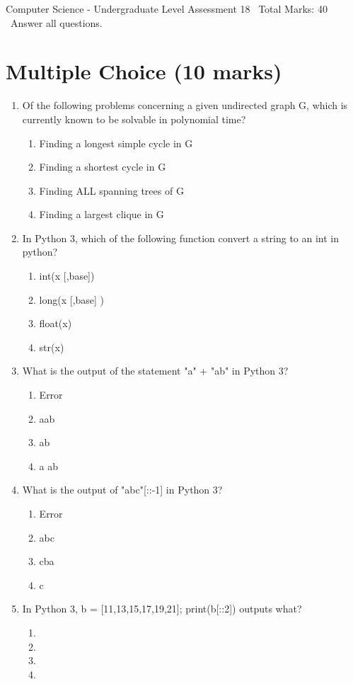 \documentclass[12pt]{article}
\begin{document}
\begin{center}
Computer Science - Undergraduate Level Assessment 18 \
Total Marks: 40 \
Answer all questions.
\end{center}

\section*{Multiple Choice (10 marks)}
\begin{enumerate}[label=\arabic*.]
\item Of the following problems concerning a given undirected graph G, which is currently known to be solvable in polynomial time?
\begin{enumerate}[label=(\alph*)]
    \item Finding a longest simple cycle in G
    \item Finding a shortest cycle in G
    \item Finding ALL spanning trees of G
    \item Finding a largest clique in G
\end{enumerate}
\item In Python 3, which of the following function convert a string to an int in python?
\begin{enumerate}[label=(\alph*)]
    \item int(x [,base])
    \item long(x [,base] )
    \item float(x)
    \item str(x)
\end{enumerate}
\item What is the output of the statement "a" + "ab" in Python 3?
\begin{enumerate}[label=(\alph*)]
    \item Error
    \item aab
    \item ab
    \item a ab
\end{enumerate}
\item What is the output of "abc"[::-1] in Python 3?
\begin{enumerate}[label=(\alph*)]
    \item Error
    \item abc
    \item cba
    \item c
\end{enumerate}
\item In Python 3, b = [11,13,15,17,19,21]; print(b[::2]) outputs what?
\begin{enumerate}[label=(\alph*)]
    \item [19,21]
    \item [11,15]
    \item [11,15,19]
    \item [13,17,21]
\end{enumerate}
\end{enumerate}
\end{document}
